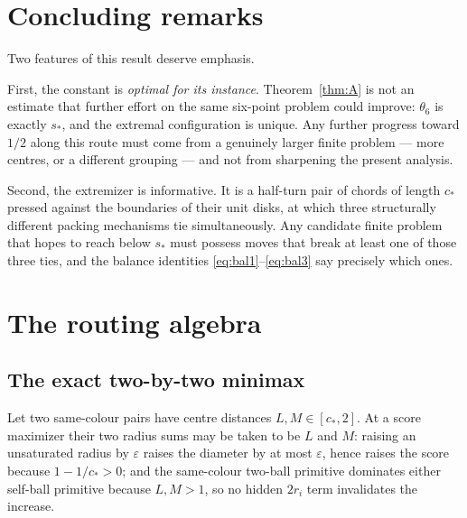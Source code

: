 \documentclass[11pt]{article}
\theoremstyle{plain}
\theoremstyle{definition}
\theoremstyle{remark}
\newcommand{\sstar}{s_{\!*}}
\newcommand{\cstar}{c_{\!*}}
\begin{document}
\section{Concluding remarks}

Two features of this result deserve emphasis.

First, the constant is \emph{optimal for its instance}.  Theorem~\ref{thm:A}
is not an estimate that further effort on the same six-point problem could
improve: $\theta_6$ is exactly $\sstar$, and the extremal configuration is
unique.  Any further progress toward $1/2$ along this route must come from
a genuinely larger finite problem --- more centres, or a different grouping
--- and not from sharpening the present analysis.

Second, the extremizer is informative.  It is a half-turn pair of chords of
length $\cstar$ pressed against the boundaries of their unit disks, at
which three structurally different packing mechanisms tie simultaneously.
Any candidate finite problem that hopes to reach below $\sstar$ must
possess moves that break at least one of those three ties, and the balance
identities \eqref{eq:bal1}--\eqref{eq:bal3} say precisely which ones.

\appendix

\section{The routing algebra}\label{app:routing}

\subsection{The exact two-by-two minimax}

Let two same-colour pairs have centre distances $L,M\in[\cstar,2]$.  At a
score maximizer their two radius sums may be taken to be $L$ and $M$:
raising an unsaturated radius by $\varepsilon$ raises the diameter by at
most $\varepsilon$, hence raises the score because $1-1/\cstar>0$; and the
same-colour two-ball primitive dominates either self-ball primitive
because $L,M>1$, so no hidden $2r_i$ term invalidates the increase.
\end{document}
